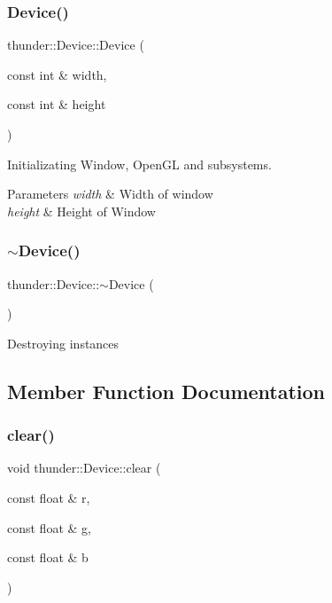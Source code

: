 \subsubsection{\texorpdfstring{Device()}{Device()}}
{\footnotesize\ttfamily thunder\+::\+Device\+::\+Device (\begin{DoxyParamCaption}\item[{const int \&}]{width,  }\item[{const int \&}]{height }\end{DoxyParamCaption})}

Initializating Window, Open\+GL and subsystems.


\begin{DoxyParams}{Parameters}
{\em width} & Width of window \\
\hline
{\em height} & Height of Window \\
\hline
\end{DoxyParams}
\mbox{\label{classthunder_1_1_device_abc93ee78a90cf3084d52608183a48284}} 
\subsubsection{\texorpdfstring{$\sim$\+Device()}{~Device()}}
{\footnotesize\ttfamily thunder\+::\+Device\+::$\sim$\+Device (\begin{DoxyParamCaption}{ }\end{DoxyParamCaption})}

Destroying instances 

\subsection{Member Function Documentation}
\mbox{\label{classthunder_1_1_device_ab6a17ea2f5c6e68fea19bf3aea014a61}} 
\subsubsection{\texorpdfstring{clear()}{clear()}}
{\footnotesize\ttfamily void thunder\+::\+Device\+::clear (\begin{DoxyParamCaption}\item[{const float \&}]{r,  }\item[{const float \&}]{g,  }\item[{const float \&}]{b }\end{DoxyParamCaption})}

